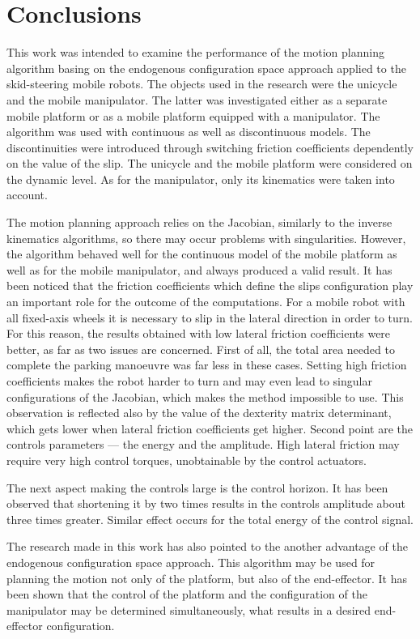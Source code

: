 \chapter{Conclusions}
\label{ch:concl}
This work was intended to examine the performance of the motion planning algorithm basing on the endogenous configuration space approach applied to the skid-steering mobile robots. The objects used in the research were the unicycle and the mobile manipulator. The latter was investigated either as a separate mobile platform or as a mobile platform equipped with a manipulator.
The algorithm was used with continuous as well as discontinuous models. The discontinuities were introduced through switching friction coefficients dependently on the value of the slip. The unicycle and the mobile platform were considered on the dynamic level. As for the manipulator, only its kinematics were taken into account.

The motion planning approach relies on the Jacobian, similarly to the inverse kinematics algorithms, so there may occur problems with singularities. However, the algorithm behaved well for the continuous model of the mobile platform as well as for the mobile manipulator, and always produced a valid result. It has been noticed that the friction coefficients which define the slips configuration play an important role for the outcome of the computations. For a mobile robot with all fixed-axis wheels it is necessary to slip in the lateral direction in order to turn. For this reason, the results obtained with low lateral friction coefficients were better, as far as two issues are concerned. First of all, the total area needed to complete the parking manoeuvre was far less in these cases. Setting high friction coefficients makes the robot harder to turn and may even lead to singular configurations of the Jacobian, which makes the method impossible to use. This observation is reflected also by the value of the dexterity matrix determinant, which gets lower when lateral friction coefficients get higher. Second point are the controls parameters --- the energy and the amplitude. High lateral friction may require very high control torques, unobtainable by the control actuators.

The next aspect making the controls large is the control horizon. It has been observed that shortening it by two times results in the controls amplitude about three times greater. Similar effect occurs for the total energy of the control signal.

The research made in this work has also pointed to the another advantage of the endogenous configuration space approach. This algorithm may be used for planning the motion not only of the platform, but also of the end-effector. It has been shown that the control of the platform and the configuration of the manipulator may be determined simultaneously, what results in a desired end-effector configuration.

